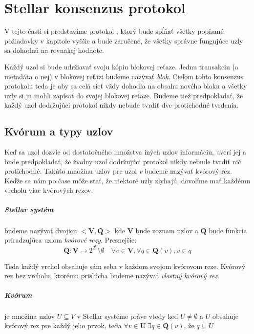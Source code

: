 \chapter{Stellar konsenzus protokol}

\label{kap:stellar}

V tejto časti si predstavíme protokol \cite{mazieres2015stellar}, ktorý bude
spĺňať všetky popísané požiadavky v kapitole vyššie a bude zaručené,
že všetky správne fungujúce uzly sa dohodnú na rovnakej hodnote.

Každý uzol si bude udržiavať svoju kópiu blokovej reťaze. Jednu transakciu (a
metadáta o nej) v blokovej reťazi budeme nazývať \textit{blok}.
Cieľom tohto konsenzus protokolu teda je aby sa celá sieť vždy dohodla
na obsahu nového bloku a všetky uzly si ju mohli zapísať do svojej
blokovej reťaze. 
Budeme tiež predpokladať, že každý uzol dodržujúci protokol nikdy nebude tvrdiť
dve protichodné tvrdenia.

\section {Kvórum a typy uzlov}

Keď sa uzol dozvie od dostatočného množstva iných uzlov informáciu, uverí jej a
bude predpokladať, že žiadny uzol dodržujúci protokol nikdy nebude tvrdiť nič
protichodné.
Takúto množinu uzlov pre uzol \textit{v} budeme nazývať kvórový rez. Keďže
sa nám po čase môže stať, že niektoré uzly zlyhajú, dovolíme mať každému vrcholu
viac kvórových rezov.

\paragraph {Stellar systém} budeme nazývať
dvojicu $<\textbf{V},\textbf{Q}>$ kde $\textbf{V}$ bude zoznam uzlov a $\textbf
{Q}$ bude funkcia priradzujúca uzlom \textit{kvórové rezy}.
\newline
Presnejšie:
$$\textbf{Q} : \textbf{V} \to 2^{2^V} \setminus \emptyset \quad
\forall v \in \textbf{V}, \forall q \in \textbf{Q}(v), v \in q$$


Teda každý vrchol obsahuje sám seba v každom svojom kvórovom reze.
Kvórový rez bez vrcholu, ktorému prislúcha budeme nazývať \textit{vlastný kvórový rez}.

\paragraph {Kvórum} je množina uzlov $U \subseteq V$ v
Stellar systéme práve vtedy keď $U \neq \emptyset$ a $U$ obsahuje kvórový rez pre
každý jeho prvok, teda $\forall v \in \textbf{U} \: \exists q \in \textbf{Q}
(v)$,
že $q \subseteq U$

